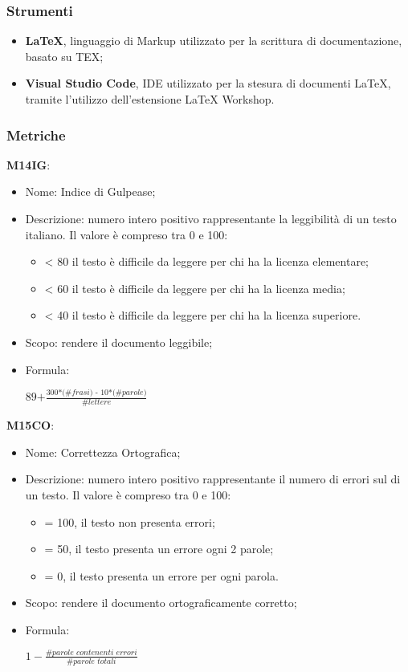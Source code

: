 \subsubsection{Strumenti}
\begin{itemize}
  \item \textbf{LaTeX}, linguaggio di Markup utilizzato per la scrittura di documentazione, basato su TEX;
  \item \textbf{Visual Studio Code}, IDE utilizzato per la stesura di documenti LaTeX, tramite l'utilizzo dell'estensione LaTeX Workshop.
\end{itemize}

\subsubsection{Metriche}
\textbf{M14IG}:
  \begin{itemize}
    \item Nome: Indice di Gulpease;
    \item Descrizione: numero intero positivo rappresentante la leggibilità di un testo italiano. Il valore è compreso tra 0 e 100:
      \begin{itemize}
        \item < 80 il testo è difficile da leggere per chi ha la licenza elementare;
        \item < 60 il testo è difficile da leggere per chi ha la licenza media;
        \item < 40 il testo è difficile da leggere per chi ha la licenza superiore.
      \end{itemize}
    \item Scopo: rendere il documento leggibile;
    \item Formula:
    \begin{center}
    $ \textit{89+}\frac{\textit{300*(\#frasi) - 10*(\#parole)}}{\textit{\#lettere}}$
    \end{center}
  \end{itemize}
\textbf{M15CO}:
  \begin{itemize}
    \item Nome: Correttezza Ortografica;
    \item Descrizione: numero intero positivo rappresentante il numero di errori sul di un testo. Il valore è compreso tra 0 e 100:
      \begin{itemize}
        \item = 100, il testo non presenta errori;
        \item = 50, il testo presenta un errore ogni 2 parole;
        \item = 0, il testo presenta un errore per ogni parola.
      \end{itemize}
    \item Scopo: rendere il documento ortograficamente corretto;
    \item Formula:
    \begin{center}
      $ 1 - \frac{\textit{\#parole contenenti errori}}{\textit{\#parole totali}}$
    \end{center}

  \end{itemize}